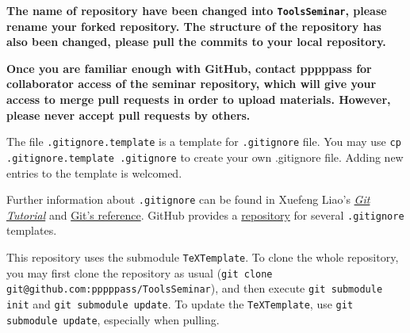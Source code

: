 \documentclass[english]{../TeXTemplate/pkupaper}
\begin{document}
\textbf{The name of repository have been changed into \texttt{ToolsSeminar}, please rename your forked repository. The structure of the repository has also been changed, please pull the commits to your local repository.}

\textbf{Once you are familiar enough with GitHub, contact pppppass for collaborator access of the seminar repository, which will give your access to merge pull requests in order to upload materials. However, please never accept pull requests by others.}

The file \verb".gitignore.template" is a template for \verb".gitignore" file. You may use \verb"cp .gitignore.template .gitignore" to create your own .gitignore file. Adding new entries to the template is welcomed.

Further information about \verb".gitignore" can be found in Xuefeng Liao's \href{https://www.liaoxuefeng.com/wiki/0013739516305929606dd18361248578c67b8067c8c017b000/0013758404317281e54b6f5375640abbb11e67be4cd49e0000}{\emph{Git Tutorial}} and \href{https://git-scm.com/docs/gitignore}{Git's reference}. GitHub provides a \href{https://github.com/github/gitignore}{repository} for several \verb".gitignore" templates.

This repository uses the submodule \verb"TeXTemplate". To clone the whole repository, you may first clone the repository as usual (\verb"git clone git@github.com:pppppass/ToolsSeminar"), and then execute \verb"git submodule init" and \verb"git submodule update". To update the \verb"TeXTemplate", use \verb"git submodule update", especially when pulling.
\end{document}
